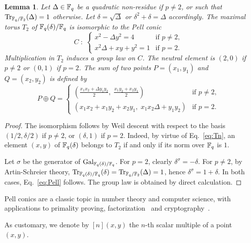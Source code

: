\documentclass{sig-alternate}
\newtheorem{lemma}[definition]{Lemma}
\begin{document}
\begin{lemma}
  Let $\Delta\in\mathbb{F}_q$ be a quadratic non-residue if $p\ne2$, or such
  that $\operatorname{Tr}_{\mathbb{F}_q/\mathbb{F}_2}(\Delta)=1$ otherwise. Let $\delta=\sqrt{\Delta}$
  or $\delta^2+\delta=\Delta$ accordingly. The
  maximal torus $T_2$ of $\mathbb{F}_q(\delta)/\mathbb{F}_q$ is isomorphic to the
  \emph{Pell conic}
  \begin{equation}
    \label{eq:Pell}
    C \;:\; 
    \begin{cases}
      x^2 - \Delta y^2 = 4 &\text{if $p\ne2$,}\\
      x^2\Delta + xy + y^2 = 1 &\text{if $p=2$.}
    \end{cases}
  \end{equation}
  Multiplication in $T_2$ induces a group law on $C$. The neutral
  element is $(2,0)$ if $p\ne2$ or $(0,1)$ if $p=2$. The sum of two
  points $P=(x_1,y_1)$ and $Q=(x_2,y_2)$ is defined
  by
  \begin{equation*}
    P\oplus Q =
    \begin{cases}
      \displaystyle
      \left(\frac{x_1x_2 + \Delta y_1y_2}{2},\; \frac{x_1y_2 + x_2y_1}{2}\right) &
      \text{if $p\ne2$,}\\
      \left(x_1x_2 + x_1y_2 + x_2y_1,\; x_1x_2\Delta + y_1y_2\right) &
      \text{if $p=2$.}
    \end{cases}
  \end{equation*}
\end{lemma}
\begin{proof}
  The isomorphism follows by Weil descent with respect to the basis
  $(1/2,\delta/2)$ if $p\ne2$, or $(\delta,1)$ if $p=2$. Indeed, by
  virtue of Eq.~\eqref{eq:Tn}, an element $(x,y)$ of $\mathbb{F}_q(\delta)$
  belongs to $T_2$ if and only if its norm over $\mathbb{F}_q$ is $1$.

  Let $\sigma$ be the generator of $\operatorname{Gal}_{\mathbb{F}_q(\delta)/\mathbb{F}_q}$. For
  $p=2$, clearly $\delta^\sigma=-\delta$. For $p\ne2$, by
  Artin-Schreier theory,
  $\operatorname{Tr}_{\mathbb{F}_q(\delta)/\mathbb{F}_q}(\delta)=\operatorname{Tr}_{\mathbb{F}_q/\mathbb{F}_2}(\Delta)=1$, hence
  $\delta^\sigma=1+\delta$. In both cases, Eq.~\eqref{eq:Pell}
  follows.  The group law is obtained by direct calculation.
\end{proof}

Pell conics are a classic topic in number theory\cite{lenstra02-pell}
and computer science, with applications to primality proving,
factorization~\cite{lemmermeyer03,hambleton12} and
cryptography~\cite{rubin-silverberg+crypto03}. 

As customary, we denote by $[n](x,y)$ the $n$-th scalar multiple of a
point $(x,y)$.
\end{document}
